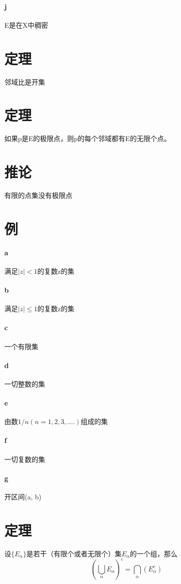 \paragraph{j} E是在X中稠密 
\section{定理} 邻域比是开集 
\section{定理} 如果p是E的极限点，则p的每个邻域都有E的无限个点。
\section*{推论} 有限的点集没有极限点
\section{例}
\paragraph{a} 满足$|z| < 1 $的复数z的集
\paragraph{b} 满足$|z| \le 1 $的复数z的集
\paragraph{c} 一个有限集
\paragraph{d} 一切整数的集
\paragraph{e} 由数$1/n (n=1, 2, 3, ....)$组成的集
\paragraph{f} 一切复数的集
\paragraph{g} 开区间(a, b)
\section{定理} 设$ \{ E_{\alpha} \}$是若干（有限个或者无限个）集$E_{\alpha}$的一个组，那么$$ ( \bigcup_{\alpha}E_{\alpha} )^c = \bigcap_{\alpha} ( E_{\alpha}^c ) $$
